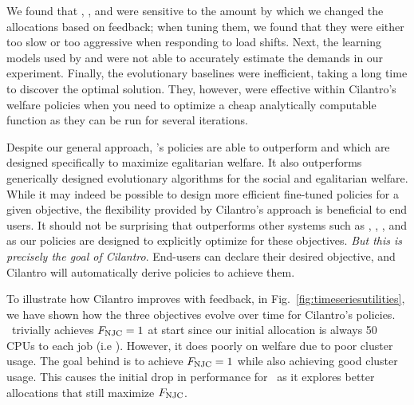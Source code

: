 We found that
\greedyew, \parties, and \AIMD{} were sensitive to the amount
by which we changed the allocations based on feedback;
when tuning them, we found that they were
either too slow or too aggressive when responding to load shifts.
Next, the learning models used by \quasar{} and \ernest{} were not able to
accurately estimate the demands in our experiment.
Finally,  the evolutionary baselines were inefficient,
taking a long time to discover the optimal solution.
They, however, were effective within Cilantro's welfare policies
when you need to optimize a cheap analytically computable function as they can be run for
several iterations.

% 


\insertFigUserUtilities

Despite our general approach, \cilantro's policies are able to
outperform \minerva{} and \greedyew{} which are designed specifically to maximize egalitarian
welfare. It also outperforms generically designed evolutionary algorithms for the social and
egalitarian welfare.
While it may indeed be possible to design more efficient fine-tuned policies for a given objective,
the flexibility provided by Cilantro's approach is beneficial to end users.
It should not be surprising that
\cilantros outperforms other systems such as \ernest, \quasar, \parties, and \AIMD{}
as our policies are designed to explicitly optimize for these objectives.
\emph{But this is precisely the goal of Cilantro}.
End-users can declare their desired objective, and Cilantro will automatically derive
policies to achieve them. 


To illustrate how Cilantro improves with feedback,
in
Fig.~\ref{fig:timeseriesutilities}, we have shown how the three objectives evolve over time for
Cilantro's policies.
\equalshare~trivially achieves $F_{\rm NJC}=1$ at start since our initial allocation
is always 50 CPUs to each job (i.e \equalshare). However, it does poorly on welfare due to poor cluster usage.
The goal behind \cilantronjcs is to achieve $F_{\rm NJC}=1$ while also achieving good cluster usage.
This causes the initial drop in performance for \cilantronjc~as it explores better allocations that still maximize $F_{\rm NJC}$.

